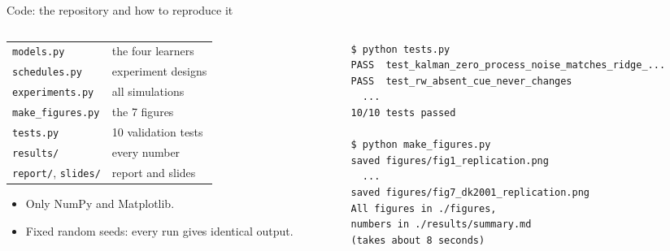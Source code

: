 \documentclass[aspectratio=169,11pt]{beamer}
\begin{document}
\begin{frame}[fragile]{Code: the repository and how to reproduce it}
\begin{columns}[T]
\begin{column}{0.4\textwidth}
\small
\begin{tabular}{@{}ll@{}}
\texttt{models.py} & the four learners\\
\texttt{schedules.py} & experiment designs\\
\texttt{experiments.py} & all simulations\\
\texttt{make\_figures.py} & the 7 figures\\
\texttt{tests.py} & 10 validation tests\\
\texttt{results/} & every number\\
\texttt{report/}, \texttt{slides/} & report and slides\\
\end{tabular}

\vspace{0.8em}
\begin{itemize}\footnotesize
\item Only NumPy and Matplotlib.
\item Fixed random seeds: every run gives identical output.
\end{itemize}
\end{column}
\begin{column}{0.58\textwidth}
\begin{lstlisting}[style=term]
$ python tests.py
PASS  test_kalman_zero_process_noise_matches_ridge_...
PASS  test_rw_absent_cue_never_changes
  ...
10/10 tests passed

$ python make_figures.py
saved figures/fig1_replication.png
  ...
saved figures/fig7_dk2001_replication.png
All figures in ./figures,
numbers in ./results/summary.md
(takes about 8 seconds)
\end{lstlisting}
\end{column}
\end{columns}
\end{frame}
\end{document}
